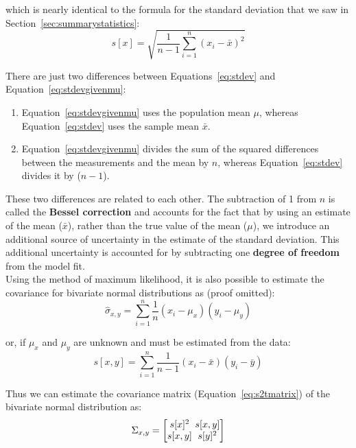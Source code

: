 \begin{refsection}
\noindent which is nearly identical to the formula for the standard
deviation that we saw in Section~\ref{sec:summarystatistics}:
\begin{equation}
  s[x] = \sqrt{\frac{1}{n-1}\sum\limits_{i=1}^{n}(x_i-\bar{x})^2}
  \label{eq:stdev}
\end{equation}

There are just two differences between
Equations~\ref{eq:stdev} and
Equation~\ref{eq:stdevgivenmu}:
\begin{enumerate}
\item Equation~\ref{eq:stdevgivenmu} uses the population mean $\mu$,
  whereas Equation~\ref{eq:stdev} uses the sample mean $\bar{x}$.
\item Equation~\ref{eq:stdevgivenmu} divides the sum of the squared
  differences between the measurements and the mean by $n$, whereas
  Equation~\ref{eq:stdev} divides it by ($n-1$).
\end{enumerate}

These two differences are related to each other. The subtraction of 1
from $n$ is called the \textbf{Bessel correction} and accounts for the
fact that by using an estimate of the mean ($\bar{x}$), rather than
the true value of the mean ($\mu$), we introduce an additional source
of uncertainty in the estimate of the standard deviation. This
additional uncertainty is accounted for by subtracting one
\textbf{degree of freedom} from the model fit.\\

Using the method of maximum likelihood, it is also possible to
estimate the covariance for bivariate normal distributions as (proof
omitted):
\begin{equation}
  \hat{\sigma}_{x,y} = \sum\limits_{i=1}^{n}\frac{1}{n}(x_i-\mu_x)(y_i-\mu_y)
\end{equation}

\noindent or, if $\mu_x$ and $\mu_y$ are unknown and must be estimated
from the data:
\begin{equation}
  s[x,y] = \sum\limits_{i=1}^{n}\frac{1}{n-1}(x_i-\bar{x})(y_i-\bar{y})
  \label{eq:sxy}
\end{equation}

Thus we can estimate the covariance matrix
(Equation~\ref{eq:s2tmatrix}) of the bivariate normal distribution as:
\begin{equation}
  \Sigma_{x,y} =
  \left[
    \begin{array}{@{}c@{~}c@{}}
      s[x]^2 & s[x,y]\\
      s[x,y] & s[y]^2
    \end{array}
    \right]
\end{equation}


\end{refsection}
